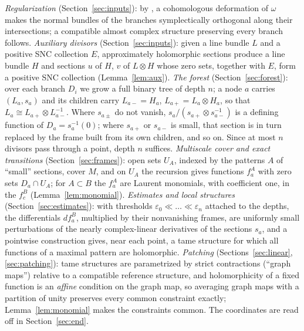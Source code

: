 \documentclass[11pt]{article}
\theoremstyle{remark}
\newcommand{\eps}{\varepsilon}
\begin{document}
\emph{Regularization} (Section~\ref{sec:inputs}): by
\cite[Theorem 2.13]{FMZ}, a cohomologous deformation of $\omega$ makes
the normal bundles of the branches symplectically orthogonal along
their intersections; a compatible almost complex structure preserving
every branch follows.
\emph{Auxiliary divisors} (Section~\ref{sec:inputs}): given a line
bundle $L$ and a positive SNC collection $E$, approximately holomorphic
sections \cite{Donaldson1996,Auroux1997,Mohsen2019} produce a line
bundle $H$ and sections $u$ of $H$, $v$ of $L\otimes H$ whose zero sets,
together with $E$, form a positive SNC collection (Lemma~\ref{lem:aux}).
\emph{The forest} (Section~\ref{sec:forest}): over each branch $D_i$ we
grow a full binary tree of depth $n$; a node $a$ carries $(L_a,s_a)$ and
its children carry $L_{a-}=H_a$, $L_{a+}=L_a\otimes H_a$, so that
$L_a\cong L_{a+}\otimes L_{a-}^{-1}$. Where $s_{a\pm}$ do not vanish,
$s_a/(s_{a+}\otimes s_{a-}^{-1})$ is a defining function of
$D_a=s_a^{-1}(0)$; where $s_{a+}$ or $s_{a-}$ is small, that section is
in turn replaced by the frame built from its own children, and so on.
Since at most $n$ divisors pass
through a point, depth $n$ suffices.
\emph{Multiscale cover and exact transitions} (Section~\ref{sec:frames}):
open sets $U_A$, indexed by the patterns $A$ of ``small'' sections,
cover $M$, and on $U_A$ the recursion gives functions $f^A_a$ with zero
sets $D_a\cap U_A$; for $A\subset B$ the $f^A_a$ are Laurent monomials,
with coefficient one, in the $f^B_c$ (Lemma~\ref{lem:monomial}).
\emph{Estimates and local structures} (Section~\ref{sec:estimates}):
with thresholds $\eps_0\ll\dots\ll\eps_n$ attached to the depths, the
differentials $df^B_a$, multiplied by their nonvanishing frames, are
uniformly small perturbations of the nearly complex-linear derivatives
of the sections $s_a$, and a pointwise construction gives, near each
point, a tame structure for which all functions of a maximal pattern
are holomorphic.
\emph{Patching} (Sections~\ref{sec:linear}, \ref{sec:patching}): tame
structures are parametrized by strict contractions (``graph maps'')
relative to a compatible reference structure, and holomorphicity of a fixed
function is an \emph{affine} condition on the graph map, so averaging
graph maps with a partition of unity preserves every common constraint
exactly; Lemma~\ref{lem:monomial} makes the constraints common. The
coordinates are read off in Section~\ref{sec:end}.
\end{document}
